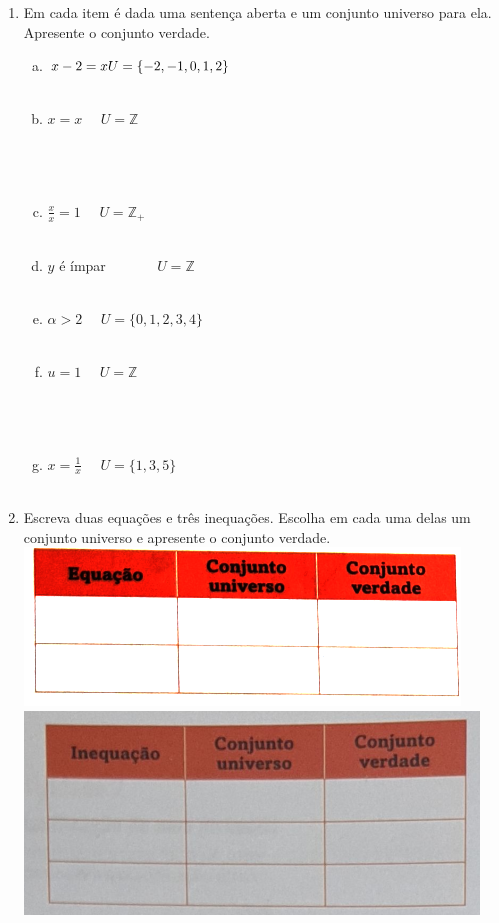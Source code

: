 \documentclass[a4paper,14pt]{article}
\begin{document}
\begin{multicols}{2}
\begin{enumerate}
    	    \item Em cada item é dada uma sentença aberta e um conjunto universo para ela. Apresente o conjunto verdade.
    	    \begin{enumerate}[a)]
    	    	\item $x - 2 = x \\ U = \{-2, -1, 0, 1, 2\}$ \\\\
    	    	\item $x = x ~~~~~~ U = \mathbb{Z}$ \\\\\\\\
    	    	\item $\frac{x}{x} = 1 ~~~~~~ U = \mathbb{Z_+}$ \\\\
    	    	\item $y$ é ímpar ~~~~~~ $U = \mathbb{Z}$ \\\\
    	    	\item $\alpha > 2 ~~~~~~ U = \{0, 1, 2, 3, 4\}$ \\\\
    	    	\item $u = 1 ~~~~~~ U = \mathbb{Z}$ \\\\\\\\
    	    	\item $x = \frac{1}{x} ~~~~~~ U = \{1, 3, 5\}$ \\\\
    	    \end{enumerate}
            \item Escreva duas equações e três inequações. Escolha em cada uma delas um conjunto universo e apresente o conjunto verdade.
            \includegraphics[width=1\linewidth]{imagens_6MFA31/tabela3}
            \includegraphics[width=1\linewidth]{imagens_6MFA31/tabela4}
    	\end{enumerate}
    \end{multicols}
\end{document}
